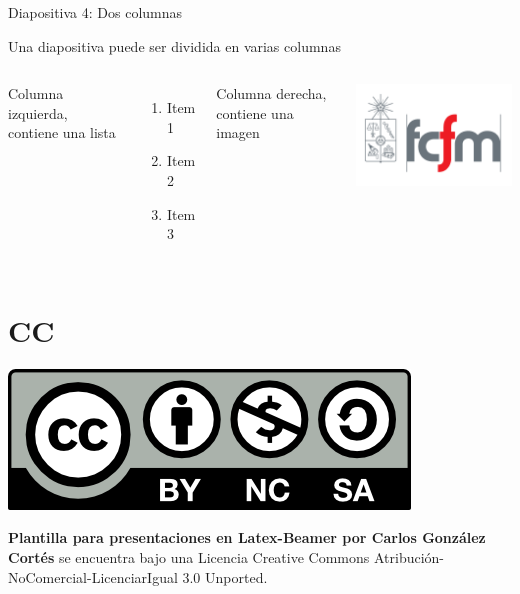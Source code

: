 \documentclass[10pt]{beamer}
\begin{document}
\begin{frame}{Diapositiva 4: Dos columnas}

\begin{center}
	Una diapositiva puede ser dividida en varias columnas
\end{center}

	\begin{columns}
		\column[t]{6cm}
			Columna izquierda, contiene una lista
			\begin{enumerate}
				\item Item 1
				\item Item 2
				\item Item 3
			\end{enumerate}

		\column[t]{6cm}
			Columna derecha, contiene una imagen
			\begin{center}
				\includegraphics[scale=0.2]{img/fcfm.png}
			\end{center}
	\end{columns}
\end{frame}


\section{CC}

\begin{frame}
	\begin{center} \includegraphics[scale=1]{img/cc.png} \end{center}
	\vspace*{1cm}
	\begin{center}
	\textbf{Plantilla para presentaciones en Latex-Beamer por Carlos González Cortés} se encuentra bajo una Licencia Creative Commons Atribución-NoComercial-LicenciarIgual 3.0 Unported. \end{center}
\end{frame}
\end{document}

